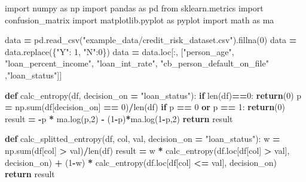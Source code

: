\documentclass[
]{book}
\newenvironment{Shaded}{\begin{snugshade}}{\end{snugshade}}
\newcommand{\BuiltInTok}[1]{#1}
\newcommand{\ControlFlowTok}[1]{\textcolor[rgb]{0.13,0.29,0.53}{\textbf{#1}}}
\newcommand{\DecValTok}[1]{\textcolor[rgb]{0.00,0.00,0.81}{#1}}
\newcommand{\ImportTok}[1]{#1}
\newcommand{\KeywordTok}[1]{\textcolor[rgb]{0.13,0.29,0.53}{\textbf{#1}}}
\newcommand{\NormalTok}[1]{#1}
\newcommand{\OperatorTok}[1]{\textcolor[rgb]{0.81,0.36,0.00}{\textbf{#1}}}
\newcommand{\StringTok}[1]{\textcolor[rgb]{0.31,0.60,0.02}{#1}}
\begin{document}
\begin{Shaded}
\begin{Highlighting}[]
\ImportTok{import}\NormalTok{ numpy }\ImportTok{as}\NormalTok{ np}
\ImportTok{import}\NormalTok{ pandas }\ImportTok{as}\NormalTok{ pd}
\ImportTok{from}\NormalTok{ sklearn.metrics }\ImportTok{import}\NormalTok{ confusion\_matrix}
\ImportTok{import}\NormalTok{ matplotlib.pyplot }\ImportTok{as}\NormalTok{ pyplot}
\ImportTok{import}\NormalTok{ math }\ImportTok{as}\NormalTok{ ma}


\NormalTok{data }\OperatorTok{=}\NormalTok{ pd.read\_csv(}\StringTok{"example\_data/credit\_risk\_dataset.csv"}\NormalTok{).fillna(}\DecValTok{0}\NormalTok{)}
\NormalTok{data }\OperatorTok{=}\NormalTok{ data.replace(\{}\StringTok{"Y"}\NormalTok{: }\DecValTok{1}\NormalTok{, }\StringTok{"N"}\NormalTok{:}\DecValTok{0}\NormalTok{\})}
\NormalTok{data }\OperatorTok{=}\NormalTok{ data.loc[:, [}\StringTok{"person\_age"}\NormalTok{, }\StringTok{"loan\_percent\_income"}\NormalTok{, }\StringTok{"loan\_int\_rate"}\NormalTok{, }\StringTok{"cb\_person\_default\_on\_file"}\NormalTok{ ,}\StringTok{"loan\_status"}\NormalTok{]]}



\KeywordTok{def}\NormalTok{ calc\_entropy(df, decision\_on }\OperatorTok{=} \StringTok{"loan\_status"}\NormalTok{):}
  \ControlFlowTok{if} \BuiltInTok{len}\NormalTok{(df)}\OperatorTok{==}\DecValTok{0}\NormalTok{:}
    \ControlFlowTok{return}\NormalTok{(}\DecValTok{0}\NormalTok{)}
\NormalTok{  p }\OperatorTok{=}\NormalTok{ np.}\BuiltInTok{sum}\NormalTok{(df[decision\_on] }\OperatorTok{==} \DecValTok{0}\NormalTok{)}\OperatorTok{/}\BuiltInTok{len}\NormalTok{(df)}
  \ControlFlowTok{if}\NormalTok{ p }\OperatorTok{==} \DecValTok{0} \KeywordTok{or}\NormalTok{ p }\OperatorTok{==} \DecValTok{1}\NormalTok{:}
    \ControlFlowTok{return}\NormalTok{(}\DecValTok{0}\NormalTok{)}
\NormalTok{  result }\OperatorTok{=} \OperatorTok{{-}}\NormalTok{p }\OperatorTok{*}\NormalTok{ ma.log(p,}\DecValTok{2}\NormalTok{) }\OperatorTok{{-}}\NormalTok{ (}\DecValTok{1}\OperatorTok{{-}}\NormalTok{p)}\OperatorTok{*}\NormalTok{ma.log(}\DecValTok{1}\OperatorTok{{-}}\NormalTok{p,}\DecValTok{2}\NormalTok{)}
  \ControlFlowTok{return}\NormalTok{ result}

\KeywordTok{def}\NormalTok{ calc\_splitted\_entropy(df, col, val, decision\_on }\OperatorTok{=} \StringTok{"loan\_status"}\NormalTok{):}
\NormalTok{  w }\OperatorTok{=}\NormalTok{ np.}\BuiltInTok{sum}\NormalTok{(df[col] }\OperatorTok{\textgreater{}}\NormalTok{ val)}\OperatorTok{/}\BuiltInTok{len}\NormalTok{(df)}
\NormalTok{  result }\OperatorTok{=}\NormalTok{ w }\OperatorTok{*}\NormalTok{ calc\_entropy(df.loc[df[col] }\OperatorTok{\textgreater{}}\NormalTok{ val], decision\_on) }\OperatorTok{+}\NormalTok{ (}\DecValTok{1}\OperatorTok{{-}}\NormalTok{w) }\OperatorTok{*}\NormalTok{ calc\_entropy(df.loc[df[col] }\OperatorTok{\textless{}=}\NormalTok{ val], decision\_on)}
  \ControlFlowTok{return}\NormalTok{ result}


\end{Highlighting}
\end{Shaded}
\end{document}
